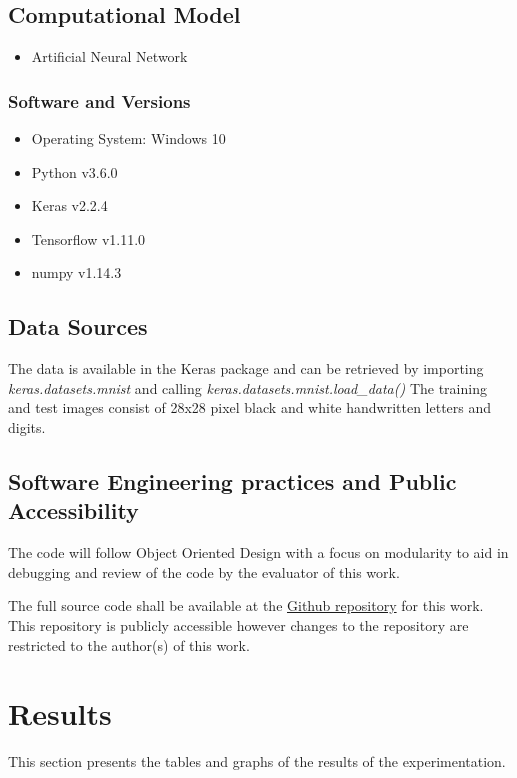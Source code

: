 \documentclass{article}
\begin{document}
\subsection{Computational Model}
\begin{itemize}
	\item Artificial Neural Network
	
\end{itemize}
\subsubsection{Software and Versions}
\begin{itemize}
	\item Operating System: Windows 10
	\item Python v3.6.0
	\item Keras v2.2.4
	\item Tensorflow v1.11.0
	\item numpy v1.14.3
\end{itemize}

\subsection{Data Sources}
The data is available in the Keras package and can be retrieved by importing \textit{keras.datasets.mnist} and calling \textit{keras.datasets.mnist.load\_data()}
The training and test images consist of 28x28 pixel black and white handwritten letters and digits.

\subsection{Software Engineering practices and Public Accessibility}
The code will follow Object Oriented Design with a focus on modularity to aid in debugging and review of the code by the evaluator of this work. 

The full source code shall be available at the \href{https://github.com/KenanKarav/CapstoneProject.git}{Github repository} for this work. This repository is publicly accessible however changes to the repository are restricted to the author(s) of this work.

\section{Results}
This section presents the tables and graphs of the results of the experimentation.
\end{document}
